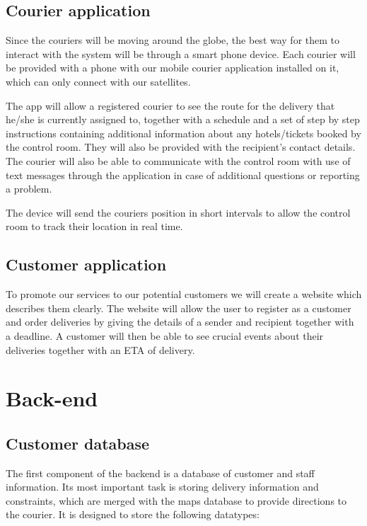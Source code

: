 \subsection{Courier application} \label{couriersarch}
Since the couriers will be moving around the globe, the best way for them to interact with the system will be through a smart phone device. Each courier will be provided with a phone with our mobile courier application installed on it, which can only connect with our satellites. 

The app will allow a registered courier to see the route for the delivery that he/she is currently assigned to, together with a schedule and a set of step by step instructions containing additional information about any hotels/tickets booked by the control room. They will also be provided with the recipient's contact details. The courier will also be able to communicate with the control room with use of text messages through the application in case of additional questions or reporting a problem. 

The device will send the couriers position in short intervals to allow the control room to track their location in real time.

\subsection{Customer application} \label{customersarch}
To promote our services to our potential customers we will create a website which describes them clearly. The website will allow the user to register as a customer and order deliveries by giving the details of a sender and recipient together with a deadline. A customer will then be able to see crucial events about their deliveries together with an ETA of delivery.


\section{Back-end} \label{backendarch}
\subsection{Customer database} \label{databasearch}
The first component of the backend is a database of customer and staff information. Its most important task is storing delivery information and constraints, which are merged with the maps database to provide directions to the courier. It is designed to store the following datatypes:

